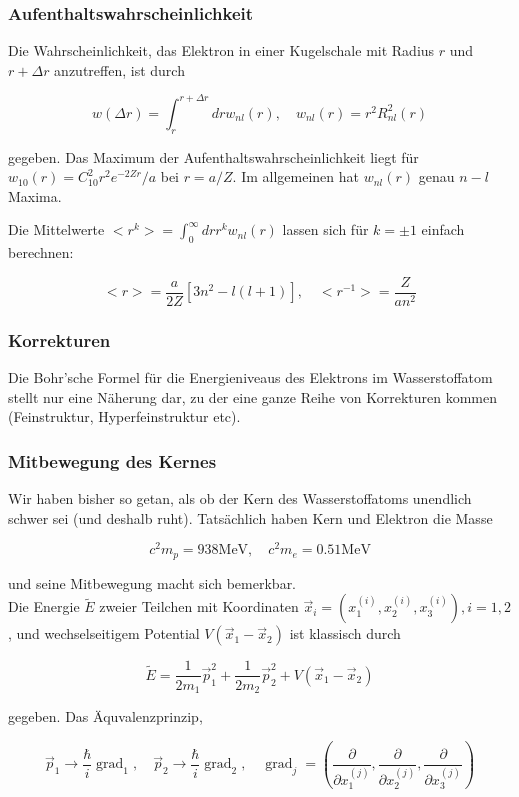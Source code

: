 \documentclass[10pt, letterpaper]{article}
\begin{document}
\subsubsection*{Aufenthaltswahrscheinlichkeit}
Die Wahrscheinlichkeit, das Elektron in einer Kugelschale mit Radius $r$ und $r+\Delta r$ anzutreffen, ist durch

$$
w(\Delta r)=\int_{r}^{r+\Delta r} d r w_{n l}(r), \quad w_{n l}(r)=r^{2} R_{n l}^{2}(r)
$$

gegeben. Das Maximum der Aufenthaltswahrscheinlichkeit liegt für $w_{10}(r)=C_{10}^{2} r^{2} e^{-2 Z r} / a$ bei $r=a / Z$. Im allgemeinen hat $w_{n l}(r)$ genau $n-l$ Maxima.

Die Mittelwerte $<r^{k}>=\int_{0}^{\infty} d r r^{k} w_{n l}(r)$ lassen sich für $k= \pm 1$ einfach berechnen:

$$
<r>=\frac{a}{2 Z}\left[3 n^{2}-l(l+1)\right], \quad<r^{-1}>=\frac{Z}{a n^{2}}
$$

\subsubsection*{Korrekturen}
Die Bohr'sche Formel für die Energieniveaus des Elektrons im Wasserstoffatom stellt nur eine Näherung dar, zu der eine ganze Reihe von Korrekturen kommen (Feinstruktur, Hyperfeinstruktur etc).

\subsubsection*{Mitbewegung des Kernes}
Wir haben bisher so getan, als ob der Kern des Wasserstoffatoms unendlich schwer sei (und deshalb ruht). Tatsächlich haben Kern und Elektron die Masse

$$
c^{2} m_{p}=938 \mathrm{MeV}, \quad c^{2} m_{e}=0.51 \mathrm{MeV}
$$

und seine Mitbewegung macht sich bemerkbar.\\
Die Energie $\tilde{E}$ zweier Teilchen mit Koordinaten $\vec{x}_{i}=\left(x_{1}^{(i)}, x_{2}^{(i)}, x_{3}^{(i)}\right), i=1,2$, und wechselseitigem Potential $V\left(\vec{x}_{1}-\vec{x}_{2}\right)$ ist klassisch durch

$$
\tilde{E}=\frac{1}{2 m_{1}} \vec{p}_{1}^{2}+\frac{1}{2 m_{2}} \vec{p}_{2}^{2}+V\left(\vec{x}_{1}-\vec{x}_{2}\right)
$$

gegeben. Das Äquvalenzprinzip,

$$
\vec{p}_{1} \rightarrow \frac{\hbar}{i} \operatorname{grad}_{1}, \quad \vec{p}_{2} \rightarrow \frac{\hbar}{i} \operatorname{grad}_{2}, \quad \operatorname{grad}_{j}=\left(\frac{\partial}{\partial x_{1}^{(j)}}, \frac{\partial}{\partial x_{2}^{(j)}}, \frac{\partial}{\partial x_{3}^{(j)}}\right)
$$
\end{document}
